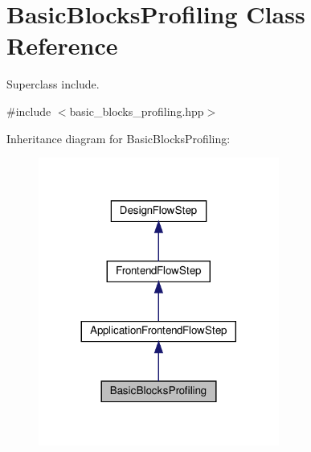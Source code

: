 \hypertarget{classBasicBlocksProfiling}{}\section{Basic\+Blocks\+Profiling Class Reference}
\label{classBasicBlocksProfiling}


Superclass include.  




{\ttfamily \#include $<$basic\+\_\+blocks\+\_\+profiling.\+hpp$>$}



Inheritance diagram for Basic\+Blocks\+Profiling\+:
\nopagebreak
\begin{figure}[H]
\begin{center}
\leavevmode
\includegraphics[width=224pt]{df/d81/classBasicBlocksProfiling__inherit__graph}
\end{center}
\end{figure}


